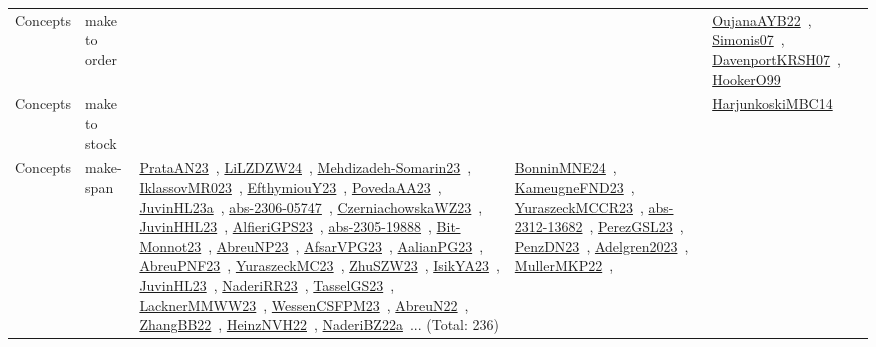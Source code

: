 {\begin{longtable}{lp{3cm}>{\raggedright\arraybackslash}p{6cm}>{\raggedright\arraybackslash}p{6cm}>{\raggedright\arraybackslash}p{8cm}}
\index{make to order}\index{Concepts!make to order}Concepts & make to order &  &  & \href{../works/OujanaAYB22.pdf}{OujanaAYB22}~\cite{OujanaAYB22}, \href{../works/Simonis07.pdf}{Simonis07}~\cite{Simonis07}, \href{../works/DavenportKRSH07.pdf}{DavenportKRSH07}~\cite{DavenportKRSH07}, \href{../works/HookerO99.pdf}{HookerO99}~\cite{HookerO99}\\
\index{make to stock}\index{Concepts!make to stock}Concepts & make to stock &  &  & \href{../works/HarjunkoskiMBC14.pdf}{HarjunkoskiMBC14}~\cite{HarjunkoskiMBC14}\\
\index{make-span}\index{Concepts!make-span}Concepts & make-span & \href{../works/PrataAN23.pdf}{PrataAN23}~\cite{PrataAN23}, \href{../works/LiLZDZW24.pdf}{LiLZDZW24}~\cite{LiLZDZW24}, \href{../works/Mehdizadeh-Somarin23.pdf}{Mehdizadeh-Somarin23}~\cite{Mehdizadeh-Somarin23}, \href{../works/IklassovMR023.pdf}{IklassovMR023}~\cite{IklassovMR023}, \href{../works/EfthymiouY23.pdf}{EfthymiouY23}~\cite{EfthymiouY23}, \href{../works/PovedaAA23.pdf}{PovedaAA23}~\cite{PovedaAA23}, \href{../works/JuvinHL23a.pdf}{JuvinHL23a}~\cite{JuvinHL23a}, \href{../works/abs-2306-05747.pdf}{abs-2306-05747}~\cite{abs-2306-05747}, \href{../works/CzerniachowskaWZ23.pdf}{CzerniachowskaWZ23}~\cite{CzerniachowskaWZ23}, \href{../works/JuvinHHL23.pdf}{JuvinHHL23}~\cite{JuvinHHL23}, \href{../works/AlfieriGPS23.pdf}{AlfieriGPS23}~\cite{AlfieriGPS23}, \href{../works/abs-2305-19888.pdf}{abs-2305-19888}~\cite{abs-2305-19888}, \href{../works/Bit-Monnot23.pdf}{Bit-Monnot23}~\cite{Bit-Monnot23}, \href{../works/AbreuNP23.pdf}{AbreuNP23}~\cite{AbreuNP23}, \href{../works/AfsarVPG23.pdf}{AfsarVPG23}~\cite{AfsarVPG23}, \href{../works/AalianPG23.pdf}{AalianPG23}~\cite{AalianPG23}, \href{../works/AbreuPNF23.pdf}{AbreuPNF23}~\cite{AbreuPNF23}, \href{../works/YuraszeckMC23.pdf}{YuraszeckMC23}~\cite{YuraszeckMC23}, \href{../works/ZhuSZW23.pdf}{ZhuSZW23}~\cite{ZhuSZW23}, \href{../works/IsikYA23.pdf}{IsikYA23}~\cite{IsikYA23}, \href{../works/JuvinHL23.pdf}{JuvinHL23}~\cite{JuvinHL23}, \href{../works/NaderiRR23.pdf}{NaderiRR23}~\cite{NaderiRR23}, \href{../works/TasselGS23.pdf}{TasselGS23}~\cite{TasselGS23}, \href{../works/LacknerMMWW23.pdf}{LacknerMMWW23}~\cite{LacknerMMWW23}, \href{../works/WessenCSFPM23.pdf}{WessenCSFPM23}~\cite{WessenCSFPM23}, \href{../works/AbreuN22.pdf}{AbreuN22}~\cite{AbreuN22}, \href{../works/ZhangBB22.pdf}{ZhangBB22}~\cite{ZhangBB22}, \href{../works/HeinzNVH22.pdf}{HeinzNVH22}~\cite{HeinzNVH22}, \href{../works/NaderiBZ22a.pdf}{NaderiBZ22a}~\cite{NaderiBZ22a}... (Total: 236) & \href{../works/BonninMNE24.pdf}{BonninMNE24}~\cite{BonninMNE24}, \href{../works/KameugneFND23.pdf}{KameugneFND23}~\cite{KameugneFND23}, \href{../works/YuraszeckMCCR23.pdf}{YuraszeckMCCR23}~\cite{YuraszeckMCCR23}, \href{../works/abs-2312-13682.pdf}{abs-2312-13682}~\cite{abs-2312-13682}, \href{../works/PerezGSL23.pdf}{PerezGSL23}~\cite{PerezGSL23}, \href{../works/PenzDN23.pdf}{PenzDN23}~\cite{PenzDN23}, \href{../works/Adelgren2023.pdf}{Adelgren2023}~\cite{Adelgren2023}, \href{../works/MullerMKP22.pdf}{MullerMKP22}~\cite{MullerMKP22}, 
\end{longtable}}
